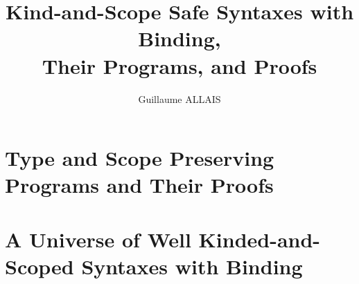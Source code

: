 \documentclass{memoir}
\title{Kind-and-Scope Safe Syntaxes with Binding, \\ Their Programs, and Proofs}
\author{Guillaume ALLAIS}
\begin{document}
\maketitle{}

\part{Type and Scope Preserving Programs and Their Proofs}
\label{type-scope-semantics}


\part{A Universe of Well Kinded-and-Scoped Syntaxes with Binding}
\label{a-universe}




\end{document}
